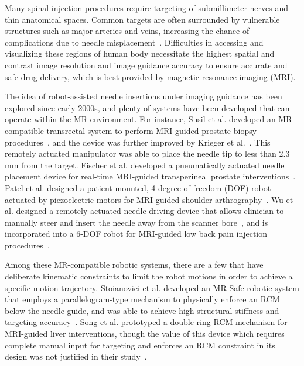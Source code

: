 Many spinal injection procedures require targeting of submillimeter nerves and thin anatomical spaces. Common targets are often surrounded by vulnerable structures such as major arteries and veins, increasing the chance of complications due to needle misplacement~\parencite{bogdukComplicationsSpinalDiagnostic2008}. Difficulties in accessing and visualizing these regions of human body necessitate the highest spatial and contrast image resolution and image guidance accuracy to ensure accurate and safe drug delivery, which is best provided by magnetic resonance imaging (MRI).

The idea of robot-assisted needle insertions under imaging guidance has been explored since early 2000s, and plenty of systems have been developed that can operate within the MR environment. For instance, Susil et al. developed an MR-compatible transrectal system to perform MRI-guided prostate biopsy procedures~\parencite{susilSystemMRImage2003,susilSystemProstateBrachytherapy2004}, and the device was further improved by Krieger et al.~\parencite{kriegerDesignNovelMRI2005}. This remotely actuated manipulator was able to place the needle tip to less than 2.3 mm from the target. Fischer et al. developed a pneumatically actuated needle placement device for real-time MRI-guided  transperineal prostate interventions~\parencite{fischerMRICompatiblePneumaticRobot2008}. Patel et al. designed a patient-mounted, 4 degree-of-freedom (DOF) robot actuated by piezoelectric motors for MRI-guided shoulder arthrography~\parencite{patelRoboticSystemMRIGuided2018}. Wu et al. designed a remotely actuated needle driving device that allows clinician to manually steer and insert the needle away from the scanner bore~\parencite{wuRemotelyActuatedNeedle2019}, and is incorporated into a 6-DOF robot for MRI-guided low back pain injection procedures~\parencite{liFullyActuatedBodyMounted2020a}.

Among these MR-compatible robotic systems, there are a few that have deliberate kinematic constraints to limit the robot motions in order to achieve a specific motion trajectory. Stoianovici et al. developed an MR-Safe robotic system that employs a parallelogram-type mechanism to physically enforce an RCM below the needle guide, and was able to achieve high structural stiffness and targeting accuracy~\parencite{stoianoviciMultiImagerCompatibleMR2018}. Song et al. prototyped a double-ring RCM mechanism for MRI-guided liver interventions, though the value of this device which requires complete manual input for targeting and enforces an RCM constraint in its design was not justified in their study~\parencite{songDesignEvaluationDouble2013}.

